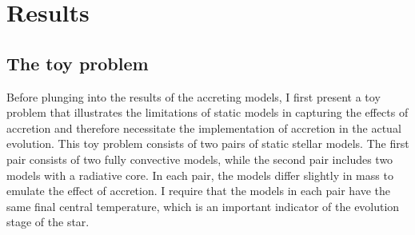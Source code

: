 \documentclass[12pt,a4paper]{article}
\newenvironment{outline}[1]{%
  \begin{itemize}[label=\textbullet]%
  \color{#1}%
}{%
  \end{itemize}%
}
\begin{document}

\section{Results}
\label{sec:results}

\subsection{The toy problem}
\label{sec:toy_problem}

Before plunging into the results of the accreting models, I first present a toy problem that illustrates the limitations of static models in capturing the effects of accretion and therefore necessitate the implementation of accretion in the actual evolution. This toy problem consists of two pairs of static stellar models. The first pair consists of two fully convective models, while the second pair includes two models with a radiative core. In each pair, the models differ slightly in mass to emulate the effect of accretion. I require that the models in each pair have the same final central temperature, which is an important indicator of the evolution stage of the star.
\end{document}
